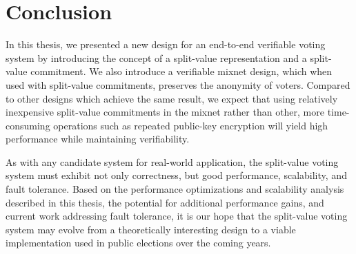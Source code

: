 \chapter{Conclusion}

In this thesis, we presented a new design for an end-to-end verifiable voting system by introducing the concept of a split-value representation and a split-value commitment. We also introduce a verifiable mixnet design, which when used with split-value commitments, preserves the anonymity of voters. Compared to other designs which achieve the same result, we expect that using relatively inexpensive split-value commitments in the mixnet rather than other, more time-consuming operations such as repeated public-key encryption will yield high performance while maintaining verifiability.

As with any candidate system for real-world application, the split-value voting system must exhibit not only correctness, but good performance, scalability, and fault tolerance. Based on the performance optimizations and scalability analysis described in this thesis, the potential for additional performance gains, and current work addressing fault tolerance, it is our hope that the split-value voting system may evolve from a theoretically interesting design to a viable implementation used in public elections over the coming years.
